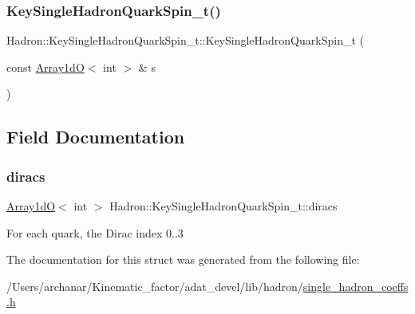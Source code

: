 \mbox{\label{structHadron_1_1KeySingleHadronQuarkSpin__t_afb7c4a9f15434b71a4782713c1e0339f}} 
\subsubsection{\texorpdfstring{KeySingleHadronQuarkSpin\_t()}{KeySingleHadronQuarkSpin\_t()}\hspace{0.1cm}{\footnotesize\ttfamily [10/10]}}
{\footnotesize\ttfamily Hadron\+::\+Key\+Single\+Hadron\+Quark\+Spin\+\_\+t\+::\+Key\+Single\+Hadron\+Quark\+Spin\+\_\+t (\begin{DoxyParamCaption}\item[{const \mbox{\hyperlink{classADAT_1_1Array1dO}{Array1dO}}$<$ int $>$ \&}]{s }\end{DoxyParamCaption})\hspace{0.3cm}{\ttfamily [inline]}}



\subsection{Field Documentation}
\mbox{\label{structHadron_1_1KeySingleHadronQuarkSpin__t_ac351a0ae22cfe303f2951feb0261e083}} 
\subsubsection{\texorpdfstring{diracs}{diracs}}
{\footnotesize\ttfamily \mbox{\hyperlink{classADAT_1_1Array1dO}{Array1dO}}$<$ int $>$ Hadron\+::\+Key\+Single\+Hadron\+Quark\+Spin\+\_\+t\+::diracs}

For each quark, the Dirac index 0..3 

The documentation for this struct was generated from the following file\+:\begin{DoxyCompactItemize}
\item 
/\+Users/archanar/\+Kinematic\+\_\+factor/adat\+\_\+devel/lib/hadron/\mbox{\hyperlink{lib_2hadron_2single__hadron__coeffs_8h}{single\+\_\+hadron\+\_\+coeffs.\+h}}\end{DoxyCompactItemize}
